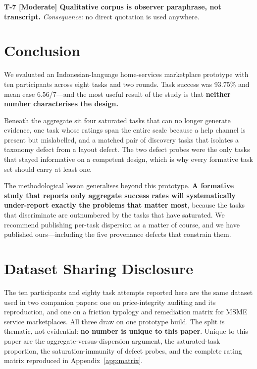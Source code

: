 \documentclass[conference]{IEEEtran}
\begin{document}
\textbf{T-7 [Moderate] Qualitative corpus is observer paraphrase, not
transcript.} \emph{Consequence:} no direct quotation is used anywhere.

\section{Conclusion}

We evaluated an Indonesian-language home-services marketplace prototype with
ten participants across eight tasks and two rounds. Task success was 93.75\%
and mean ease 6.56/7---and the most useful result of the study is that
\textbf{neither number characterises the design.}

Beneath the aggregate sit four saturated tasks that can no longer generate
evidence, one task whose ratings span the entire scale because a help channel is
present but mislabelled, and a matched pair of discovery tasks that isolates a
taxonomy defect from a layout defect. The two defect probes were the only tasks
that stayed informative on a competent design, which is why every formative task
set should carry at least one.

The methodological lesson generalises beyond this prototype. \textbf{A formative
study that reports only aggregate success rates will systematically
under-report exactly the problems that matter most}, because the tasks that
discriminate are outnumbered by the tasks that have saturated. We recommend
publishing per-task dispersion as a matter of course, and we have published
ours---including the five provenance defects that constrain them.

\section*{Dataset Sharing Disclosure}

The ten participants and eighty task attempts reported here are the same dataset
used in two companion papers: one on price-integrity auditing and its
reproduction, and one on a friction typology and remediation matrix for MSME
service marketplaces. All three draw on one prototype build. The split is
thematic, not evidential: \textbf{no number is unique to this paper}. Unique to
this paper are the aggregate-versus-dispersion argument, the saturated-task
proportion, the saturation-immunity of defect probes, and the complete rating
matrix reproduced in Appendix~\ref{app:matrix}.
\end{document}
